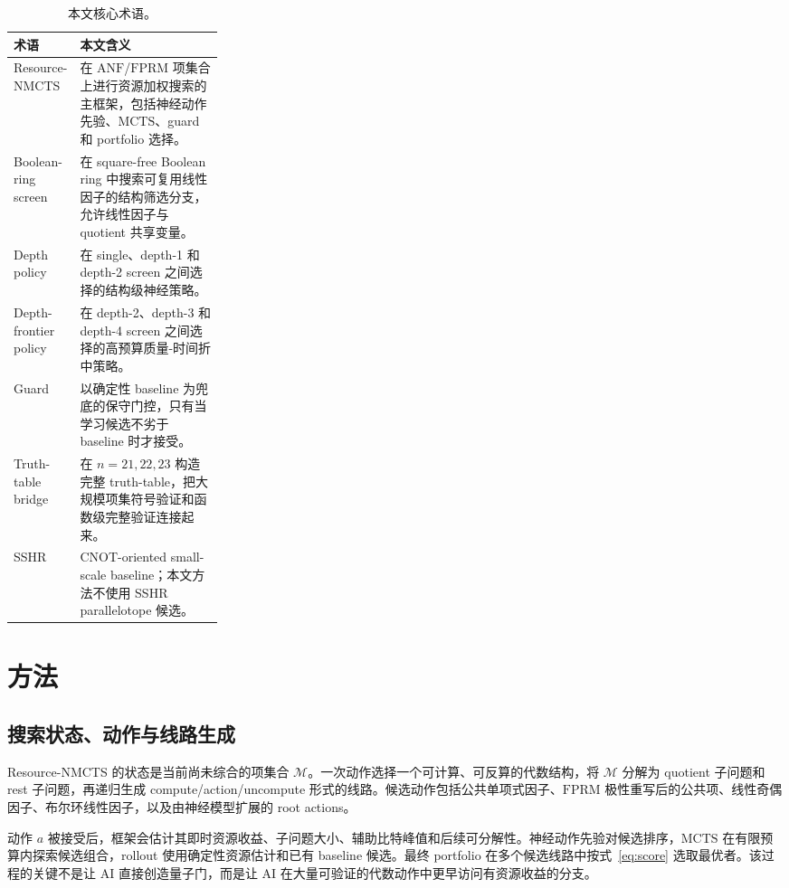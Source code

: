 \documentclass[UTF8,fontset=macnew,11pt]{ctexart}
\newcommand{\method}{Resource-NMCTS}
\newcommand{\screen}{Boolean-ring screen}
\newcommand{\anf}{\ensuremath{\mathrm{ANF}}}
\newcommand{\fprm}{\ensuremath{\mathrm{FPRM}}}
\newcommand{\mcts}{\ensuremath{\mathrm{MCTS}}}
\newcommand{\ttable}{truth-table}
\begin{document}
\begin{table}[H]
\centering
\small
\caption{本文核心术语。}
\label{tab:terms}
\begin{tabularx}{\linewidth}{>{\raggedright\arraybackslash}p{0.27\linewidth}>{\raggedright\arraybackslash}X}
\toprule
术语 & 本文含义 \\
\midrule
\method{} & 在 \anf{}/\fprm{} 项集合上进行资源加权搜索的主框架，包括神经动作先验、\mcts{}、guard 和 portfolio 选择。 \\
\screen{} & 在 square-free Boolean ring 中搜索可复用线性因子的结构筛选分支，允许线性因子与 quotient 共享变量。 \\
Depth policy & 在 single、depth-1 和 depth-2 screen 之间选择的结构级神经策略。 \\
Depth-frontier policy & 在 depth-2、depth-3 和 depth-4 screen 之间选择的高预算质量-时间折中策略。 \\
Guard & 以确定性 baseline 为兜底的保守门控，只有当学习候选不劣于 baseline 时才接受。 \\
Truth-table bridge & 在 $n=21,22,23$ 构造完整 \ttable{}，把大规模项集符号验证和函数级完整验证连接起来。 \\
SSHR & CNOT-oriented small-scale baseline；本文方法不使用 SSHR parallelotope 候选。 \\
\bottomrule
\end{tabularx}
\end{table}

\section{方法}

\subsection{搜索状态、动作与线路生成}

\method{} 的状态是当前尚未综合的项集合 $\mathcal{M}$。一次动作选择一个可计算、可反算的代数结构，将 $\mathcal{M}$ 分解为 quotient 子问题和 rest 子问题，再递归生成 compute/action/uncompute 形式的线路。候选动作包括公共单项式因子、\fprm{} 极性重写后的公共项、线性奇偶因子、布尔环线性因子，以及由神经模型扩展的 root actions。

动作 $a$ 被接受后，框架会估计其即时资源收益、子问题大小、辅助比特峰值和后续可分解性。神经动作先验对候选排序，\mcts{} 在有限预算内探索候选组合，rollout 使用确定性资源估计和已有 baseline 候选。最终 portfolio 在多个候选线路中按式~\eqref{eq:score} 选取最优者。该过程的关键不是让 AI 直接创造量子门，而是让 AI 在大量可验证的代数动作中更早访问有资源收益的分支。
\end{document}
